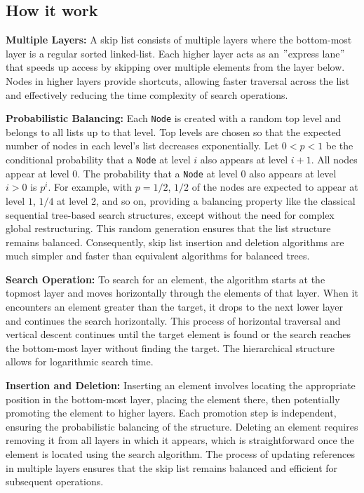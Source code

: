 \subsection*{How it work}

\textbf{Multiple Layers:} A skip list consists of multiple layers where the bottom-most layer is a regular sorted linked-list.
Each higher layer acts as an \("\)express lane\("\) that speeds up access by skipping over multiple elements from the layer below.
Nodes in higher layers provide shortcuts, allowing faster traversal across the list and effectively reducing the time complexity of search operations.

\textbf{Probabilistic Balancing:} Each \texttt{Node} is created with a random top level and belongs to all lists up to that level.
Top levels are chosen so that the expected number of nodes in each level's list decreases exponentially.
Let \(0 < p < 1\) be the conditional probability that a \texttt{Node} at level \(i\) also appears at level \(i + 1\).
All nodes appear at level \(0\).
The probability that a \texttt{Node} at level 0 also appears at level \(i > 0\) is \( p^i\).
For example, with \(p = 1/2\), \(1/2\) of the nodes are expected to appear at level \(1\), \(1/4\) at level 2, and so on, providing a balancing property like the classical sequential tree-based search structures, except without the need for complex global restructuring.
This random generation ensures that the list structure remains balanced.
Consequently, skip list insertion and deletion algorithms are much simpler and faster than equivalent algorithms for balanced trees.

\textbf{Search Operation:} To search for an element, the algorithm starts at the topmost layer and moves horizontally through the elements of that layer.
When it encounters an element greater than the target, it drops to the next lower layer and continues the search horizontally.
This process of horizontal traversal and vertical descent continues until the target element is found or the search reaches the bottom-most layer without finding the target.
The hierarchical structure allows for logarithmic search time.

\textbf{Insertion and Deletion:} Inserting an element involves locating the appropriate position in the bottom-most layer, placing the element there, then potentially promoting the element to higher layers.
Each promotion step is independent, ensuring the probabilistic balancing of the structure.
Deleting an element requires removing it from all layers in which it appears, which is straightforward once the element is located using the search algorithm.
The process of updating references in multiple layers ensures that the skip list remains balanced and efficient for subsequent operations.

